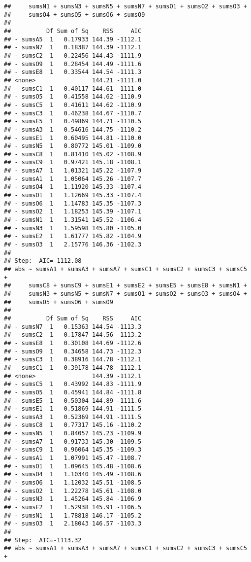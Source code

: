 \documentclass[,man,floatsintext]{apa6}
\begin{document}
\begin{verbatim}
##     sumsN1 + sumsN3 + sumsN5 + sumsN7 + sumsO1 + sumsO2 + sumsO3 + 
##     sumsO4 + sumsO5 + sumsO6 + sumsO9
## 
##          Df Sum of Sq    RSS     AIC
## - sumsA5  1   0.17933 144.39 -1112.1
## - sumsN7  1   0.18387 144.39 -1112.1
## - sumsC2  1   0.22456 144.43 -1111.9
## - sumsO9  1   0.28454 144.49 -1111.6
## - sumsE8  1   0.33544 144.54 -1111.3
## <none>                144.21 -1111.0
## - sumsC1  1   0.40117 144.61 -1111.0
## - sumsO5  1   0.41558 144.62 -1110.9
## - sumsC5  1   0.41611 144.62 -1110.9
## - sumsC3  1   0.46238 144.67 -1110.7
## - sumsE5  1   0.49869 144.71 -1110.5
## - sumsA3  1   0.54616 144.75 -1110.2
## - sumsE1  1   0.60495 144.81 -1110.0
## - sumsN5  1   0.80772 145.01 -1109.0
## - sumsC8  1   0.81410 145.02 -1108.9
## - sumsC9  1   0.97421 145.18 -1108.1
## - sumsA7  1   1.01321 145.22 -1107.9
## - sumsA1  1   1.05064 145.26 -1107.7
## - sumsO4  1   1.11920 145.33 -1107.4
## - sumsO1  1   1.12669 145.33 -1107.4
## - sumsO6  1   1.14783 145.35 -1107.3
## - sumsO2  1   1.18253 145.39 -1107.1
## - sumsN1  1   1.31541 145.52 -1106.4
## - sumsN3  1   1.59598 145.80 -1105.0
## - sumsE2  1   1.61777 145.82 -1104.9
## - sumsO3  1   2.15776 146.36 -1102.3
## 
## Step:  AIC=-1112.08
## abs ~ sumsA1 + sumsA3 + sumsA7 + sumsC1 + sumsC2 + sumsC3 + sumsC5 + 
##     sumsC8 + sumsC9 + sumsE1 + sumsE2 + sumsE5 + sumsE8 + sumsN1 + 
##     sumsN3 + sumsN5 + sumsN7 + sumsO1 + sumsO2 + sumsO3 + sumsO4 + 
##     sumsO5 + sumsO6 + sumsO9
## 
##          Df Sum of Sq    RSS     AIC
## - sumsN7  1   0.15363 144.54 -1113.3
## - sumsC2  1   0.17847 144.56 -1113.2
## - sumsE8  1   0.30108 144.69 -1112.6
## - sumsO9  1   0.34658 144.73 -1112.3
## - sumsC3  1   0.38916 144.78 -1112.1
## - sumsC1  1   0.39178 144.78 -1112.1
## <none>                144.39 -1112.1
## - sumsC5  1   0.43992 144.83 -1111.9
## - sumsO5  1   0.45941 144.84 -1111.8
## - sumsE5  1   0.50304 144.89 -1111.6
## - sumsE1  1   0.51869 144.91 -1111.5
## - sumsA3  1   0.52369 144.91 -1111.5
## - sumsC8  1   0.77317 145.16 -1110.2
## - sumsN5  1   0.84057 145.23 -1109.9
## - sumsA7  1   0.91733 145.30 -1109.5
## - sumsC9  1   0.96064 145.35 -1109.3
## - sumsA1  1   1.07991 145.47 -1108.7
## - sumsO1  1   1.09645 145.48 -1108.6
## - sumsO4  1   1.10340 145.49 -1108.6
## - sumsO6  1   1.12032 145.51 -1108.5
## - sumsO2  1   1.22278 145.61 -1108.0
## - sumsN3  1   1.45264 145.84 -1106.9
## - sumsE2  1   1.52938 145.91 -1106.5
## - sumsN1  1   1.78818 146.17 -1105.2
## - sumsO3  1   2.18043 146.57 -1103.3
## 
## Step:  AIC=-1113.32
## abs ~ sumsA1 + sumsA3 + sumsA7 + sumsC1 + sumsC2 + sumsC3 + sumsC5 + 

\end{verbatim}
\end{document}
